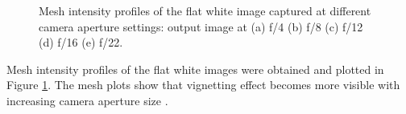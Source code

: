 
\captionsetup[figure]{width=5in}
\begin{figure}[h!]
\caption{Mesh intensity profiles of the flat white image captured at different camera aperture settings: output image at (a) f/4 (b) f/8 (c) f/12 (d) f/16 (e) f/22.}
\label{fig:meshwhite}
\end{figure}

Mesh intensity profiles of the flat white images were obtained and plotted in Figure \ref{fig:meshwhite}. The mesh plots show that vignetting effect becomes more visible with increasing camera aperture size \cite{Juang2007}. 


